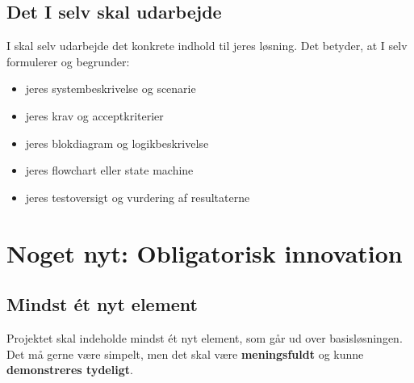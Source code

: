 \documentclass[12pt, a4paper]{article}
\begin{document}
\subsection{Det I selv skal udarbejde}

\begin{tcolorbox}[tipbox, title={\faCheckSquare\quad Jeres eget projektmateriale}]
I skal selv udarbejde det konkrete indhold til jeres løsning. Det betyder, at
I selv formulerer og begrunder:
\begin{itemize}[leftmargin=1.2em, itemsep=2pt]
  \item jeres systembeskrivelse og scenarie
  \item jeres krav og acceptkriterier
  \item jeres blokdiagram og logikbeskrivelse
  \item jeres flowchart eller state machine
  \item jeres testoversigt og vurdering af resultaterne
\end{itemize}
\end{tcolorbox}

\section{Noget nyt: Obligatorisk innovation}

\subsection{Mindst ét nyt element}

Projektet skal indeholde mindst ét nyt element, som går ud over basisløsningen.
Det må gerne være simpelt, men det skal være \textbf{meningsfuldt} og kunne
\textbf{demonstreres tydeligt}.
\end{document}
